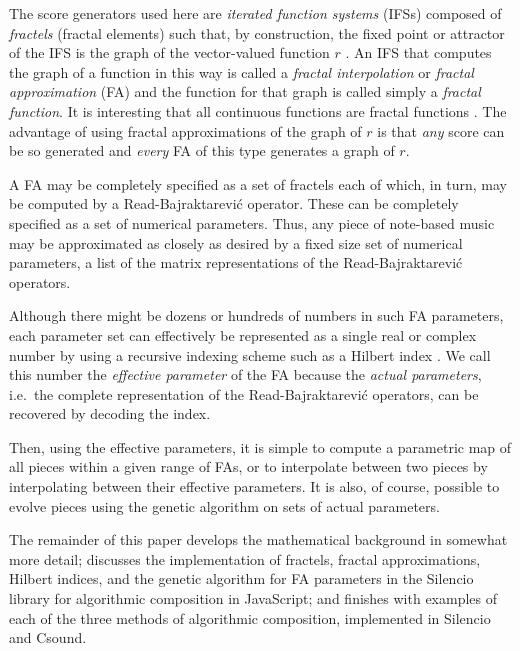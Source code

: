 \documentclass[english,11pt,letterpaper,onecolumn]{scrartcl}
\begin{document}
The score generators used here are \textit{iterated function systems} (IFSs) 
\cite{barnsley1985iterated, 10.2307/24893080, fractalseverywhere} composed of 
\textit{fractels} (fractal elements) such that, by construction, the fixed 
point or attractor of the IFS is the graph of the vector-valued function $r$ 
\cite{2016arXiv161001369B}. An IFS that computes the graph of a function in 
this way is called a \textit{fractal interpolation} or \textit{fractal 
approximation} (FA) \cite{Barnsley1986, fractalseverywhere, 
navascues2014fractal} and the function for that graph is called simply a 
\textit{fractal function}. It is interesting that all continuous functions are 
fractal functions \cite{2016arXiv161001369B}. The advantage of using fractal 
approximations of the graph of $r$ is that \textit{any} score can be so 
generated and \textit{every} FA of this type generates a graph of $r$.

A FA may be completely specified as a set of fractels each of which, 
in turn, may be computed by a Read-Bajraktarevi\'{c} operator. These can be 
completely specified as a set of numerical parameters. Thus, any piece of 
note-based music may be approximated as closely as desired by a fixed size set 
of numerical parameters, a list of the matrix representations of the 
Read-Bajraktarevi\'{c} operators.

Although there might be dozens or hundreds of numbers in such FA parameters, 
each parameter set can effectively be represented as a single real or complex 
number by using a recursive indexing scheme such as a Hilbert index 
\cite{hamilton2006compact}. We call this number the \textit{effective 
parameter} of the FA because the \textit{actual parameters}, i.e.\ the 
complete representation of the Read-Bajraktarevi\'{c} operators, can be 
recovered by decoding the index. 

Then, using the effective parameters, it is simple to compute a parametric map 
of all pieces within a given range of FAs, or to interpolate between two 
pieces by interpolating between their effective parameters. It is also, of 
course, possible to evolve pieces using the genetic algorithm on sets of 
actual parameters.

The remainder of this paper develops the mathematical background in 
somewhat more detail; discusses the implementation of fractels, fractal 
approximations, Hilbert indices, and the genetic algorithm for FA parameters 
in the Silencio library for algorithmic composition in JavaScript; and 
finishes with examples of each of the three methods of algorithmic 
composition, implemented in Silencio and Csound.
\end{document}
